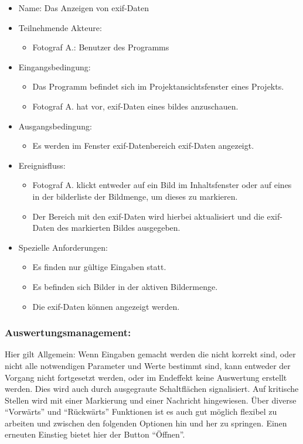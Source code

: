 	\begin{itemize}
		\item Name: Das Anzeigen von \gls{exif}-Daten
		\item Teilnehmende Akteure:
		\begin{itemize}
			\item	Fotograf A.: Benutzer des Programms		
		\end{itemize}
		\item Eingangsbedingung:
		\begin{itemize}
			\item	Das Programm befindet sich im Projektansichtsfenster eines Projekts.
			\item Fotograf A. hat vor, \gls{exif}-Daten eines bildes anzuschauen.
		\end{itemize}
		\item Ausgangsbedingung:
		\begin{itemize}
			\item	Es werden im Fenster \gls{exif}-Datenbereich \gls{exif}-Daten angezeigt.	
		\end{itemize}
		\item Ereignisfluss:
		\begin{itemize}
			\item Fotograf A. klickt entweder auf ein Bild im Inhaltsfenster oder auf eines in der bilderliste der Bildmenge, um dieses zu markieren.
			\item Der Bereich mit den \gls{exif}-Daten wird hierbei aktualisiert und die \gls{exif}-Daten des markierten Bildes ausgegeben.
		\end{itemize}
		\item Spezielle Anforderungen:
		\begin{itemize}
			\item	Es finden nur gültige Eingaben statt.
			\item Es befinden sich Bilder in der aktiven Bildermenge.
			\item Die \gls{exif}-Daten können angezeigt werden.			
		\end{itemize}			
	\end{itemize}
		
	\subsubsection{Auswertungsmanagement:}
Hier gilt Allgemein: Wenn Eingaben gemacht werden die nicht korrekt sind, oder nicht alle notwendigen Parameter und Werte bestimmt sind, kann entweder der Vorgang nicht fortgesetzt werden, oder im Endeffekt keine Auswertung erstellt werden. Dies wird auch durch ausgegraute Schaltflächen signalisiert. Auf kritische Stellen wird mit einer Markierung und einer Nachricht hingewiesen. Über diverse "`Vorwärts"' und "`Rückwärts"' Funktionen ist es auch gut möglich flexibel zu arbeiten und zwischen den folgenden Optionen hin und her zu springen. Einen erneuten Einstieg bietet hier der Button "`Öffnen"'.
 
